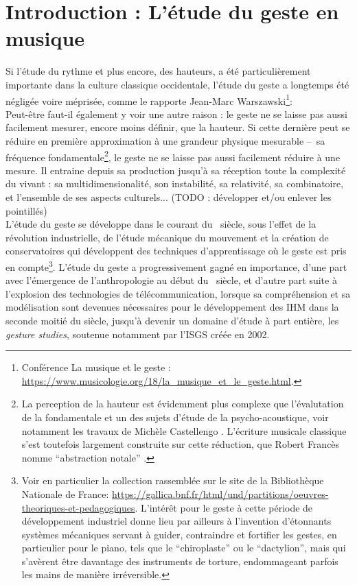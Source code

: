 \section{Introduction : L'étude du geste en musique}

\noindent Si l'étude du rythme et plus encore, des hauteurs, a été particulièrement importante dans la culture classique occidentale, l'étude du geste a longtemps été négligée voire méprisée, comme le rapporte Jean-Marc Warszawski\footnote{Conférence La musique et le geste : \url{https://www.musicologie.org/18/la_musique_et_le_geste.html}.}: \\
\indent Peut-être faut-il également y voir une autre raison : le geste ne se laisse pas aussi facilement mesurer, encore moins définir, que la hauteur. Si cette dernière peut se  réduire en première approximation à une grandeur physique mesurable --~sa fréquence fondamentale\footnote{La perception de la hauteur est évidemment plus complexe que l'évalutation de la fondamentale et un des sujets d'étude de la psycho-acoustique, voir notamment les travaux de Michèle Castellengo \cite{castellengo_ecoute_2015}. L'écriture musicale classique s'est toutefois largement construite sur cette réduction, que Robert Francès nomme ``abstraction notale'' \cite{frances_perception_1984}.}, le geste ne se laisse pas aussi facilement réduire à une mesure. Il entraine depuis sa production jusqu'à sa réception toute la complexité du vivant : sa multidimensionalité, son instabilité, sa relativité, sa combinatoire, et l'ensemble de ses aspects culturels... (TODO : développer et/ou enlever les pointillés)\\
\indent L'étude du geste se développe dans le courant du ~siècle, sous l'effet de la révolution industrielle, de l'étude mécanique du mouvement et la création de conservatoires qui développent des techniques d'apprentissage où le geste est pris en compte\footnote{Voir en particulier la collection rassemblée sur le site de la Bibliothèque Nationale de France: \url{https://gallica.bnf.fr/html/und/partitions/oeuvres-theoriques-et-pedagogiques}. L'intérêt pour le geste à cette période de développement industriel donne lieu par ailleurs à l'invention d'étonnants systèmes mécaniques servant à guider, contraindre et fortifier les gestes, en particulier pour le piano, tels que le ``chiroplaste'' ou le ``dactylion'', mais qui s'avèrent être davantage des instruments de torture, endommageant parfois les mains de manière irréversible.}. L'étude du geste a progressivement gagné en importance, d'une part avec l'émergence de l'anthropologie au début du ~siècle, et d'autre part suite à l'explosion des technologies de télécommunication, lorsque sa compréhension et sa modélisation sont devenues nécessaires pour le développement des \gls{IHM} dans la seconde moitié du siècle, jusqu'à devenir un domaine d'étude à part entière, les \textit{gesture studies}, soutenue notamment par l'\gls{ISGS} créée en 2002.\\
